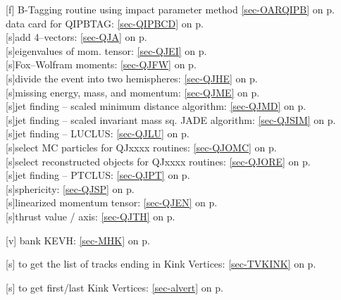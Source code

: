 [f] B-Tagging routine using impact parameter method
 \ref{sec-OARQIPB} on p.~\pageref{sec-OARQIPB}\\
 data card for QIPBTAG: \ref{sec-QIPBCD} on p.~\pageref{sec-QIPBCD}\\
 [s]add 4--vectors: \ref{sec-QJA} on p.~\pageref{sec-QJA}\\
 [s]eigenvalues of mom. tensor: \ref{sec-QJEI} on p.~\pageref{sec-QJEI}\\
 [s]Fox--Wolfram moments: \ref{sec-QJFW} on p.~\pageref{sec-QJFW}\\
 [s]divide the event into two hemispheres:
 \ref{sec-QJHE} on p.~\pageref{sec-QJHE}\\
 [s]missing energy, mass, and momentum:
 \ref{sec-QJME} on p.~\pageref{sec-QJME}\\
 [s]jet finding -- scaled minimum distance algorithm:
 \ref{sec-QJMD} on p.~\pageref{sec-QJMD}\\
 [s]jet finding -- scaled invariant mass sq. JADE algorithm:
 \ref{sec-QJSIM} on p.~\pageref{sec-QJSIM}\\
 [s]jet finding -- LUCLUS: \ref{sec-QJLU} on p.~\pageref{sec-QJLU}\\
 [s]select MC particles for QJxxxx routines: \ref{sec-QJOMC}
 on p.~\pageref{sec-QJOMC}\\
 [s]select reconstructed objects for QJxxxx routines: \ref{sec-QJORE}
 on p.~\pageref{sec-QJORE}\\
 [s]jet finding -- PTCLUS: \ref{sec-QJPT}
 on p.~\pageref{sec-QJPT}\\
 [s]sphericity: \ref{sec-QJSP} on p.~\pageref{sec-QJSP}\\
 [s]linearized momentum tensor: \ref{sec-QJEN} on
 p.~\pageref{sec-QJEN}\\
 [s]thrust value / axis: \ref{sec-QJTH}
 on p.~\pageref{sec-QJTH}
 
 [v] bank KEVH: \ref{sec-MHK} on p.~\pageref{sec-MHK}
 
 [s] to get the list of tracks ending in Kink Vertices: \ref{sec-TVKINK} on p.~\pageref{sec-TVKINK}
 
 [s] to get first/last Kink Vertices: \ref{sec-alvert} on p.~\pageref{sec-alvert}
 
